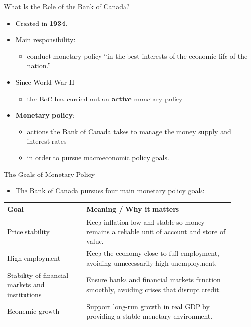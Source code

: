 \documentclass[aspectratio=169]{beamer}
\begin{document}
\begin{frame}{What Is the Role of the Bank of Canada?}
\transfade
\begin{itemize}[<+->]
  \item Created in \textbf{1934}.
  \item Main responsibility:
  \begin{itemize}[<+->]
    \item conduct monetary policy “in the best interests of the economic life of the nation.”
  \end{itemize}
  \item Since World War II:
  \begin{itemize}[<+->]
    \item the BoC has carried out an \textbf{active} monetary policy.
  \end{itemize}
  \item \textbf{Monetary policy}:
  \begin{itemize}[<+->]
    \item actions the Bank of Canada takes to manage the \alert{money supply} and \alert{interest rates}
    \item in order to pursue \alert{macroeconomic policy goals}.
  \end{itemize}
\end{itemize}
\end{frame}

\begin{frame}{The Goals of Monetary Policy}
\transfade
\begin{itemize}[<+->]
  \item The Bank of Canada pursues four main monetary policy goals:
\end{itemize}
\begin{table}[h]
\centering
\begin{tabular}{p{0.32\linewidth} p{0.6\linewidth}}
\toprule
\textbf{Goal} & \textbf{Meaning / Why it matters} \\
\midrule
Price stability & Keep inflation low and stable so money remains a reliable unit of account and store of value. \\
High employment & Keep the economy close to full employment, avoiding unnecessarily high unemployment. \\
Stability of financial markets and institutions & Ensure banks and financial markets function smoothly, avoiding crises that disrupt credit. \\
Economic growth & Support long-run growth in real GDP by providing a stable monetary environment. \\
\bottomrule
\end{tabular}
\end{table}
\end{frame}
\end{document}
